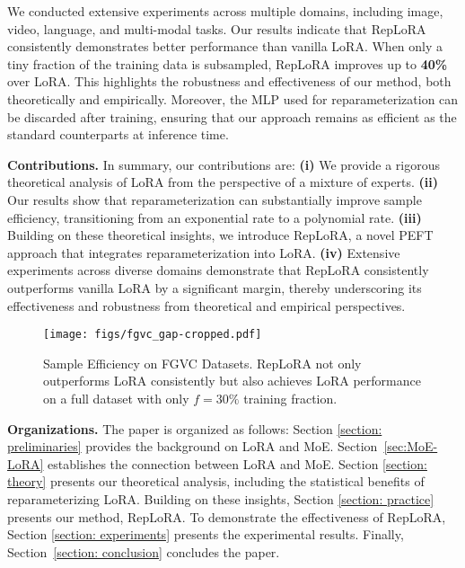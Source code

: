 We conducted extensive experiments across multiple domains, including image, video, language, and multi-modal tasks. Our results indicate that RepLoRA consistently demonstrates better performance than vanilla LoRA. When only a tiny fraction of the training data is subsampled, RepLoRA improves up to \textbf{40\%} over LoRA. This highlights the robustness and effectiveness of our method, both theoretically and empirically. Moreover, the MLP used for reparameterization can be discarded after training, ensuring that our approach remains as efficient as the standard counterparts at inference time.

\vspace{0.5 em}
\noindent
\textbf{Contributions.} In summary, our contributions are: 
\textbf{(i)} We provide a rigorous theoretical analysis of LoRA from the perspective of a mixture of experts. 
\textbf{(ii)} Our results show that reparameterization can substantially improve sample efficiency, transitioning from an exponential rate to a polynomial rate. 
\textbf{(iii)} Building on these theoretical insights, we introduce RepLoRA, a novel PEFT approach that integrates reparameterization into LoRA. 
\textbf{(iv)} Extensive experiments across diverse domains demonstrate that RepLoRA consistently outperforms vanilla LoRA by a significant margin, thereby underscoring its effectiveness and robustness from theoretical and empirical perspectives.



\begin{figure}
    \centering
    \texttt{[image: figs/fgvc\_gap-cropped.pdf]}
    \caption{Sample Efficiency on FGVC Datasets. RepLoRA not only outperforms LoRA consistently but also achieves LoRA performance on a full dataset with only $f = 30\%$ training fraction.}
    \label{fig: sample efficiency}
    \vspace{-6mm}
\end{figure}
\vspace{0.5 em}
\noindent
\textbf{Organizations.} The paper is organized as follows: Section \ref{section: preliminaries} provides the background on LoRA and MoE. Section~\ref{sec:MoE-LoRA} establishes the connection between LoRA and MoE. Section \ref{section: theory}  presents our theoretical analysis, including the statistical benefits of reparameterizing LoRA. Building on these insights, Section \ref{section: practice} presents our method, RepLoRA. To demonstrate the effectiveness of RepLoRA, Section \ref{section: experiments} presents the experimental results. Finally, Section~\ref{section: conclusion} concludes the paper.


